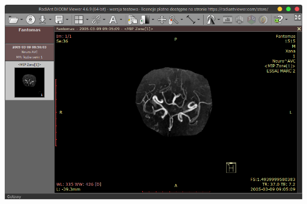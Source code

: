 \documentclass[aspectratio=169]{beamer}
\begin{document}
\begin{frame}[t]
\begin{columns}[T]
        \includegraphics[width=\textwidth]{img/test002.png}
    \end{columns}

\end{frame}
\end{document}
